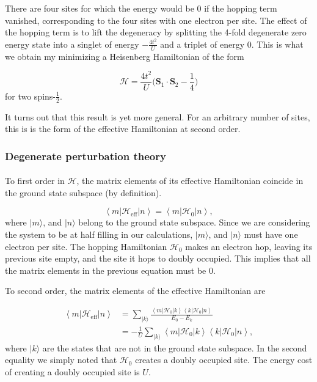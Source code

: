 There are four sites for which the energy would be 0 if the hopping term vanished, corresponding to the four sites with one electron per site. The effect of the hopping term is to lift the degeneracy by splitting the 4-fold degenerate zero energy state into a singlet of energy $-\frac{4t^2}{U}$ and a triplet of energy $0$. This is what we obtain my minimizing a Heisenberg Hamiltonian of the form

\begin{equation}
\mathcal{H} = \frac{4t^2}{U} \bigg( \bm S_1 \cdot \bm S_2 - \frac{1}{4} \bigg)
\end{equation}
for two spins-$\frac{1}{2}$.

It turns out that this result is yet more general. For an arbitrary number of sites, this is is the form of the effective Hamiltonian at second order.

\subsubsection{Degenerate perturbation theory}\paragraph{}

To first order in $\mathcal{H}$, the matrix elements of its effective Hamiltonian coincide in the ground state subspace (by definition).

\begin{equation}
\left\langle m | \mathcal{H}_{\text{eff}} | n \right\rangle = \left\langle m | \mathcal{H}_0 | n \right\rangle ,
\end{equation}
where $| m \rangle$, and $| n \rangle$ belong to the ground state subspace. Since we are considering the system to be at half filling in our calculations, $| m\rangle$, and $| n \rangle$ must have one electron per site. The hopping Hamiltonian $\mathcal{H}_0$ makes an electron hop, leaving its previous site empty, and the site it hops to doubly occupied. This implies that all the matrix elements in the previous equation must be 0.

To second order, the matrix elements of the effective Hamiltonian are

\begin{equation}
\begin{split}
\left \langle m | \mathcal{H}_{\text{eff}} | n \right\rangle &= \sum_{ | k \rangle} \frac{\left\langle m | \mathcal{H}_0 | k \right\rangle \left\langle k | \mathcal{H}_0 | n \right\rangle }{E_0 - E_k} \\
&=-\frac{1}{U} \sum_{ | k \rangle} \left\langle m | \mathcal{H}_0 | k \right\rangle \left\langle k | \mathcal{H}_0 | n \right\rangle ,
\end{split}
\end{equation}
where $| k \rangle$ are the states that are not in the ground state subspace. In the second equality we simply noted that $\mathcal{H}_0$ creates a doubly occupied site. The energy cost of creating a doubly occupied site is $U$. 

